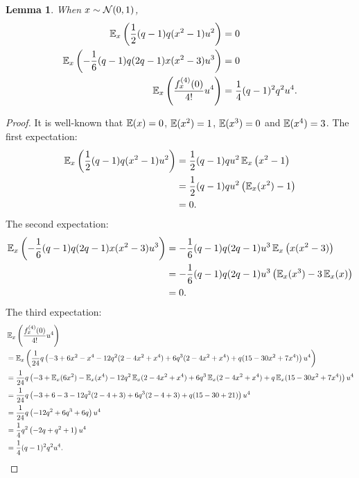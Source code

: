 \documentclass{article}
\theoremstyle{plain}
\newtheorem{lemma}[theorem]{Lemma}
\theoremstyle{definition}
\theoremstyle{remark}
\begin{document}
\begin{lemma}\label{lemma:integral-f-taylor-approximation}
    When $x\sim \mathcal{N}(0, 1)$,
    \begin{align}
        \operatorname{\mathbb{E}}_x\left(\frac{1}{2}(q - 1)q(x^2 - 1)u^2 \right) &= 0 \\
        \operatorname{\mathbb{E}}_x\left(-\frac{1}{6}(q - 1)q(2q - 1)x(x^2 - 3)u^3\right) &= 0 \\
        \operatorname{\mathbb{E}}_x\left(\frac{f_x^{(4)}(0)}{4!}u^4\right) &= \frac{1}{4}(q - 1)^2q^2u^4.
    \end{align}
\end{lemma}
\begin{proof}
    It is well-known that $\operatorname{\mathbb{E}}(x) = 0$, $\operatorname{\mathbb{E}}(x^2) = 1$, $\operatorname{\mathbb{E}}(x^3) = 0$ and $\operatorname{\mathbb{E}}(x^4) = 3$.
    The first expectation:
    \begin{equation}
        \begin{split}
            \operatorname{\mathbb{E}}_x\left(\frac{1}{2}(q - 1)q(x^2 - 1)u^2 \right)
            &= \frac{1}{2}(q - 1)qu^2\operatorname{\mathbb{E}}_x\left(x^2 - 1\right)
            \\&= \frac{1}{2}(q - 1)qu^2\left(\operatorname{\mathbb{E}}_x(x^2) - 1\right)
            \\&= 0.
        \end{split}
    \end{equation}
    The second expectation:
    \begin{equation}
        \begin{split}
            \operatorname{\mathbb{E}}_x\left(-\frac{1}{6}(q - 1)q(2q - 1)x(x^2 - 3)u^3\right)
            &= -\frac{1}{6}(q - 1)q(2q - 1)u^3\operatorname{\mathbb{E}}_x\left(x(x^2 - 3)\right)
            \\&= -\frac{1}{6}(q - 1)q(2q - 1)u^3\left(\operatorname{\mathbb{E}}_x(x^3) - 3\operatorname{\mathbb{E}}_x(x)\right)
            \\&= 0.
        \end{split}
    \end{equation}
    The third expectation:
    \begin{equation}
        \begin{split}
            &\operatorname{\mathbb{E}}_x\left(\frac{f_x^{(4)}(0)}{4!}u^4\right)
            \\&= \operatorname{\mathbb{E}}_x\left(\frac{1}{24}q\left(-3 + 6x^2 - x^4 - 12q^2(2 - 4x^2 + x^4) 
            + 6q^3(2 - 4x^2 + x^4) + q(15 - 30x^2 + 7x^4)\right)u^4\right)
            \\&= \frac{1}{24}q\left(-3 + \operatorname{\mathbb{E}}_x(6x^2) - \operatorname{\mathbb{E}}_x(x^4) - 12q^2\operatorname{\mathbb{E}}_x(2 - 4x^2 + x^4) 
            + 6q^3\operatorname{\mathbb{E}}_x(2 - 4x^2 + x^4) + q\operatorname{\mathbb{E}}_x(15 - 30x^2 + 7x^4)\right)u^4
            \\&= \frac{1}{24}q\left(-3 + 6 - 3 - 12q^2(2 - 4 + 3) 
            + 6q^3(2 - 4 + 3) + q(15 - 30 + 21)\right)u^4
            \\&= \frac{1}{24}q\left(-12q^2 + 6q^3 + 6q\right)u^4
            \\&= \frac{1}{4}q^2\left(-2q + q^2 + 1\right)u^4
            \\&= \frac{1}{4}(q - 1)^2q^2u^4.
        \end{split}
    \end{equation}
    
\end{proof}
\end{document}
